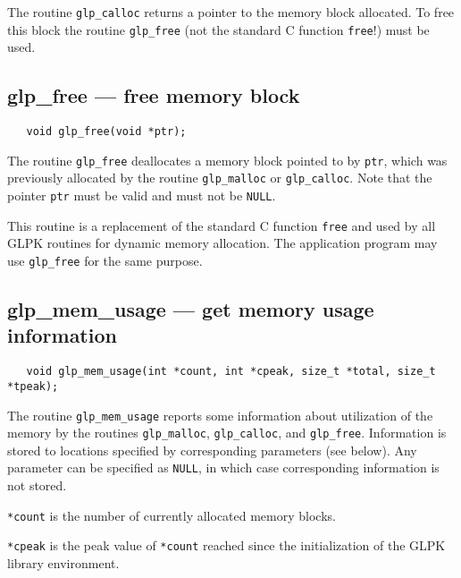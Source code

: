 \returns

The routine \verb|glp_calloc| returns a pointer to the memory block
allocated. To free this block the routine \verb|glp_free| (not the
standard C function \verb|free|!) must be used.

\subsection{glp\_free --- free memory block}

\synopsis

\begin{verbatim}
   void glp_free(void *ptr);
\end{verbatim}

\description

The routine \verb|glp_free| deallocates a memory block pointed to by
\verb|ptr|, which was previously allocated by the routine
\verb|glp_malloc| or \verb|glp_calloc|. Note that the pointer
\verb|ptr| must be valid and must not be \verb|NULL|.

This routine is a replacement of the standard C function \verb|free|
and used by all GLPK routines for dynamic memory allocation. The
application program may use \verb|glp_free| for the same purpose.

\newpage

\subsection{glp\_mem\_usage --- get memory usage information}

\synopsis

\begin{verbatim}
   void glp_mem_usage(int *count, int *cpeak, size_t *total, size_t *tpeak);
\end{verbatim}

\description

The routine \verb|glp_mem_usage| reports some information about
utilization of the memory by the routines \verb|glp_malloc|,
\verb|glp_calloc|, and \verb|glp_free|. Information is stored to
locations specified by corresponding parameters (see below). Any
parameter can be specified as \verb|NULL|, in which case corresponding
information is not stored.

\verb|*count| is the number of currently allocated memory blocks.

\verb|*cpeak| is the peak value of \verb|*count| reached since the
initialization of the GLPK library environment.

